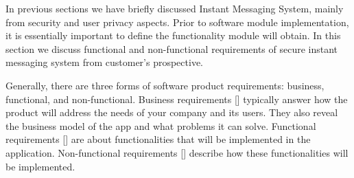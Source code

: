In previous sections we have briefly discussed Instant Messaging System, mainly from security and user privacy aspects.
Prior to software module implementation, it is essentially important to define the functionality module will obtain.
In this section we discuss functional and non-functional requirements of secure instant messaging system from customer's prospective.

Generally, there are three forms of software product requirements: business, functional, and non-functional.
Business requirements [\cite{dilworth2007creation}] typically answer how the product will address the needs of your company and its users.
They also reveal the business model of the app and what problems it can solve.
Functional requirements [\cite{malan2001functional}] are about functionalities that will be implemented in the application.
Non-functional requirements [\cite{chung2012non}] describe how these functionalities will be implemented.



